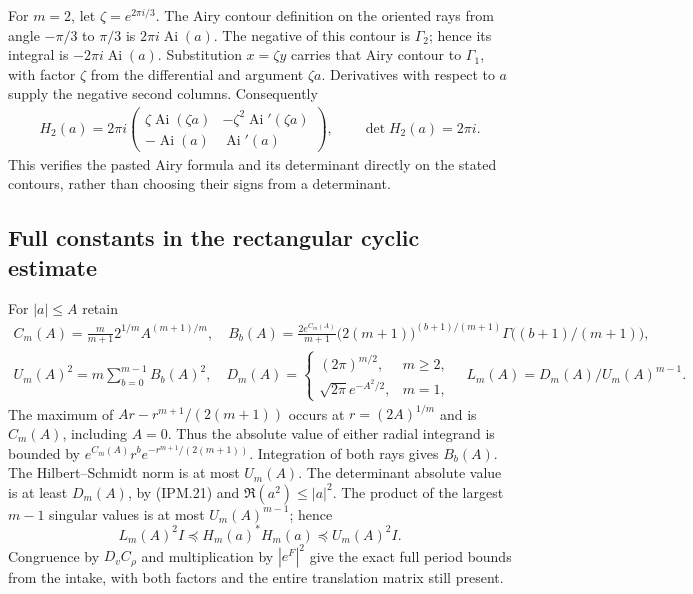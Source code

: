 \documentclass[11pt,a4paper]{article}
\theoremstyle{definition}
\begin{document}
For \(m=2\), let \(\zeta=e^{2\pi i/3}\). The Airy contour
definition on the oriented rays from angle \(-\pi/3\) to \(\pi/3\)
is \(2\pi i\operatorname{Ai}(a)\). The negative of this contour
is \(\Gamma_2\); hence its integral is
\(-2\pi i\operatorname{Ai}(a)\). Substitution \(x=\zeta y\)
carries that Airy contour to \(\Gamma_1\), with factor \(\zeta\)
from the differential and argument \(\zeta a\). Derivatives with
respect to \(a\) supply the negative second columns. Consequently
\[
 \begin{gathered}
 H_2(a)=2\pi i
 \begin{pmatrix}
  \zeta\operatorname{Ai}(\zeta a)&-\zeta^2\operatorname{Ai}'(\zeta a)\\
  -\operatorname{Ai}(a)&\operatorname{Ai}'(a)
 \end{pmatrix},\qquad \det H_2(a)=2\pi i.
 \end{gathered}
 \tag{IPM.22}
\]
This verifies the pasted Airy formula and its determinant directly on
the stated contours, rather than choosing their signs from a determinant.

\subsection{Full constants in the rectangular cyclic estimate}

For \(|a|\le A\) retain
\[
 \begin{gathered}
 C_m(A)=\frac m{m+1}2^{1/m}A^{(m+1)/m},\quad
 B_b(A)=\frac{2e^{C_m(A)}}{m+1}
       \bigl(2(m+1)\bigr)^{(b+1)/(m+1)}
                         \Gamma\bigl((b+1)/(m+1)\bigr),\\
 U_m(A)^2=m\sum_{b=0}^{m-1}B_b(A)^2,\quad
 D_m(A)=\begin{cases}(2\pi)^{m/2},&m\ge2,\\
                 \sqrt{2\pi}e^{-A^2/2},&m=1,\end{cases}\quad
 L_m(A)=D_m(A)/U_m(A)^{m-1}.
 \end{gathered}
 \tag{IPM.23}
\]
The maximum of \(Ar-r^{m+1}/(2(m+1))\) occurs at
\(r=(2A)^{1/m}\) and is \(C_m(A)\), including \(A=0\).
Thus the absolute value of either radial integrand is bounded by
\(e^{C_m(A)}r^be^{-r^{m+1}/(2(m+1))}\). Integration of both rays
gives \(B_b(A)\). The Hilbert--Schmidt norm is at most \(U_m(A)\).
The determinant absolute value is at least \(D_m(A)\), by (IPM.21)
and \(\Re(a^2)\le|a|^2\). The product of the largest \(m-1\)
singular values is at most \(U_m(A)^{m-1}\); hence
\[
 L_m(A)^2I\preceq H_m(a)^*H_m(a)\preceq U_m(A)^2I.
 \tag{IPM.24}
\]
Congruence by \(D_vC_\rho\) and multiplication by \(|e^F|^2\)
give the exact full period bounds from the intake, with both factors
and the entire translation matrix still present.
\end{document}

